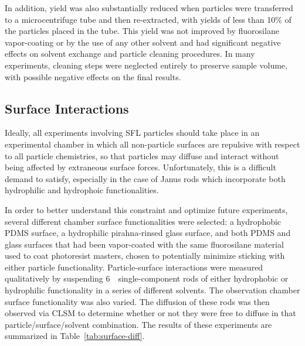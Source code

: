 In addition, yield was also substantially reduced when particles were transferred to a microcentrifuge tube
and then re-extracted, with yields of less than 10\% of the particles placed in the tube.  This yield was
not improved by fluorosilane vapor-coating or by the use of any other solvent and had significant
negative effects on solvent exchange and particle cleaning procedures.  In many experiments, cleaning 
steps were neglected entirely to preserve sample volume, with possible negative effects on the final results.

\subsection{Surface Interactions}
\label{sec:surface-interact}

Ideally, all experiments involving SFL particles should take place in an experimental
chamber in which all non-particle surfaces are repulsive with respect to all
particle chemistries, so that particles may diffuse and interact without 
being affected by extraneous surface forces.  Unfortunately, this is a difficult demand to 
satisfy, especially in the case of Janus rods which incorporate both hydrophilic and 
hydrophoic functionalities. 

In order to better understand this constraint and optimize future experiments, several different 
chamber surface
functionalities were selected: a hydrophobic PDMS surface, a hydrophilic pirahna-rinsed glass surface,
and both PDMS and glass surfaces that had been vapor-coated with the same fluorosilane material used
to coat photoresist masters, chosen to potentially minimize sticking with either particle functionality.
Particle-surface interactions were measured qualitatively by suspending 6~\microns~single-component rods
of either hydrophobic or hydrophilic functionality in a series of different solvents.
The observation chamber surface functionality was also varied.
The diffusion of these rods was then observed via CLSM to 
determine whether or not they were free to diffuse in that particle/surface/solvent combination.
The results of these experiments are summarized in Table~\ref{tab:surface-diff}.

